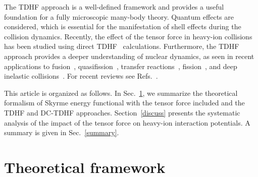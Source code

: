 \documentclass[aps,prc,twocolumn,showpacs,superscriptaddress,longbibliography,nofootinbib,floatfix,10pt]{revtex4-1}
\begin{document}
The TDHF approach is a well-defined framework and provides a useful foundation for a fully microscopic many-body theory.
Quantum effects are considered, which is essential for the manifestation of shell effects during the collision dynamics.
Recently, the effect of the tensor force in heavy-ion collisions has been studied using direct TDHF~\cite{Fracasso2012_PRC86-044303,Dai2014_SciChinaPMA57-1618,Stevenson2016_PRC93-054617,Shi2017_NPR34-41,Guo2018_PLB782-401} calculations.
Furthermore, the TDHF approach provides a deeper understanding of nuclear dynamics, as seen in recent applications to fusion~\cite{Simenel2004_PRL93-102701,Umar2009_PRC80-041601,Oberacker2010_PRC82-034603,Guo2012_EPJWoC38-09003,
Keser2012_PRC85-044606,Umar2012_PRC85-055801,Simenel2013_PRC88-024617,
Umar2014_PRC89-034611,Washiyama2015_PRC91-064607,Tohyama2016_PRC93-034607,Godbey2017_PRC95-011601,Simenel2017_PRC95-031601},
quasifission~\cite{Golabek2009_PRL103-042701,Oberacker2014_PRC90-054605,Umar2015_PRC92-024621,Umar2016_PRC94-024605,Yu2017_SciChinaPMA60-092011}, transfer reactions~\cite{Washiyama2009_PRC80-031602,Simenel2010_PRL105-192701,Simenel2011_PRL106-112502,Scamps2013_PRC87-014605,Sekizawa2013_PRC88-014614,
Wang2016_PLB760-236,Sekizawa2016_PRC93-054616,Sekizawa2017_PRC96-041601},
fission~\cite{Simenel2014_PRC89-031601,Scamps2015_PRC92-011602,Goddard2015_PRC92-054610,Goddard2016_PRC93-014620,Bulgac2016_PRL116-122504,Tanimura2017_PRL118-152501},
and deep inelastic collisions~\cite{Maruhn2006_PRC74-027601,Guo2007_PRC76-014601,Guo2008_PRC77-041301,Iwata2011_PRC84-014616,Dai2014_PRC90-044609,Dai2014_SciChinaPMA57-1618,
Stevenson2016_PRC93-054617,Guo2017_EPJWoC163-00021,Shi2017_NPR34-41,Umar2017_PRC96-024625}.
For recent reviews see Refs.~\cite{Simenel2012_EPJA48-152,Nakatsukasa2016_RMP88-045004,Simenel2018_PPNP}.

This article is organized as follows. In Sec.~\ref{theory}, we summarize the theoretical formalism of Skyrme energy functional with the tensor force included and the TDHF and DC-TDHF approaches.
Section~\ref{discuss} presents the systematic analysis of the impact of the tensor force on heavy-ion interaction potentials.
A summary is given in Sec.~\ref{summary}.

\section{Theoretical framework}
\label{theory}
\end{document}
